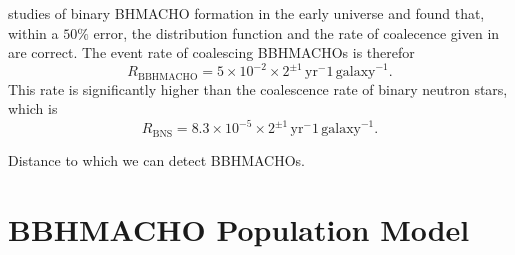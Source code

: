 studies of binary BHMACHO formation in the early universe\cite{Ioka:1998nz}
and found that, within a $50\%$ error, the distribution function and the rate
of coalecence given in \cite{Nakamura:1997sm} are correct. The event rate of
coalescing BBHMACHOs is therefor
\begin{equation}
R_\mathrm{BBHMACHO} = 5\times 10^{-2}\times 2^{\pm
1}\,\mathrm{yr}^-1\,\mathrm{galaxy}^{-1}.
\end{equation}
This rate is significantly higher than the coalescence rate of
binary neutron stars, which is
\begin{equation}
R_\mathrm{BNS} = 8.3\times 10^{-5}\times 2^{\pm
1}\,\mathrm{yr}^-1\,\mathrm{galaxy}^{-1}.
\end{equation}

Distance to which we can detect BBHMACHOs.

\section{BBHMACHO Population Model}
\label{s:bbhmachopopulation}

